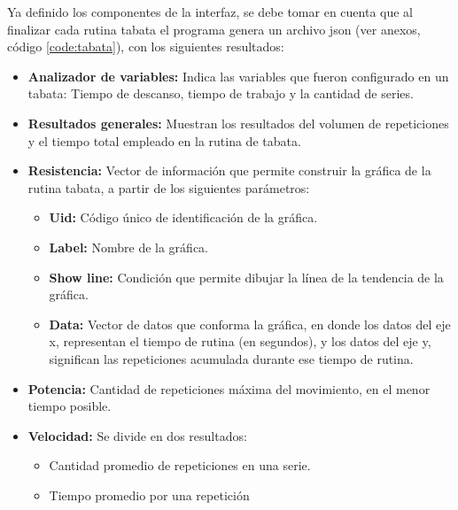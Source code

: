 Ya definido los componentes de la interfaz, se debe tomar en cuenta que al finalizar cada rutina tabata  el programa genera un archivo json (ver anexos, c\'odigo  \ref{code:tabata}), con los siguientes resultados:
\begin{itemize}
	\item \textbf{Analizador de variables:} Indica las variables que fueron configurado en un tabata: Tiempo de descanso, tiempo de trabajo y la cantidad de series.
	\item  \textbf{Resultados generales:} Muestran los resultados del volumen de repeticiones  y el tiempo total empleado en la rutina de tabata.
	\item  \textbf{Resistencia:} Vector de informaci\'on que permite construir la gr\'afica de la rutina tabata, a partir de los siguientes par\'ametros:
	   \begin{itemize}  
   	\item \textbf{Uid:} C\'odigo \'unico de identificaci\'on de la gr\'afica.
   	\item \textbf{Label:} Nombre de la gr\'afica.
   	\item \textbf{Show line:} Condici\'on que permite dibujar la l\'inea de la tendencia de la gr\'afica.
    \item \textbf{Data:} Vector de datos que conforma la gr\'afica, en donde los datos del eje x, representan el tiempo de rutina (en segundos), y los datos del eje y, significan las repeticiones acumulada durante ese tiempo de rutina.
   \end{itemize}     
    \item \textbf{Potencia:} Cantidad de repeticiones m\'axima del movimiento, en el menor tiempo posible.
    \item \textbf{Velocidad:} Se divide en dos resultados:
           \begin{itemize}
       \item Cantidad promedio de repeticiones en una serie.
       \item Tiempo promedio por una repetici\'on
       \end{itemize}
\end{itemize} 

